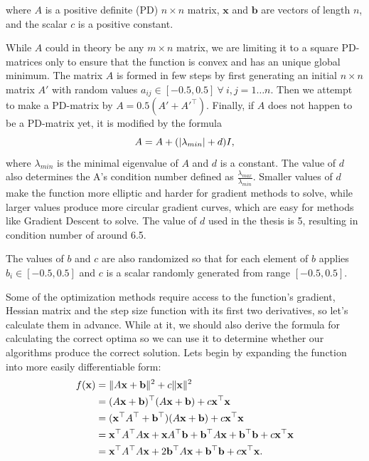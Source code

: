 \documentclass[a4paper,english,titlepage,12pt]{article}
\newcommand{\vect}[1]{\ensuremath{\mathbf{#1}}}
\newcommand{\trans}[1]{\ensuremath\vect{#1}^\top}
\newcommand{\norm}[1]{\ensuremath\Vert #1 \Vert}
\newcommand{\abs}[1]{\ensuremath|#1|}
\begin{document}
where $A$ is a positive definite (PD) $n \times n$ matrix, $\vect{x}$ and $\vect{b}$ are vectors of length $n$, and the scalar $c$ is a positive constant.

While $A$ could in theory be any $m \times n$ matrix, we are limiting it to a square PD-matrices only to ensure that the function is convex and has an unique global minimum. The matrix $A$ is formed in few steps by first generating an initial $n \times n$ matrix $A'$ with random values $a_{ij} \in [-0.5, 0.5]\ \forall\ i,j = 1 \dots n$. Then we attempt to make a PD-matrix by $A = 0.5 (A' + A'^\top)$. Finally, if  $A$ does not happen to be a PD-matrix yet, it is modified by the formula 
\begin{equation}
    A = A + (\abs{\lambda_{min}} + d) I,
\end{equation}
where $\lambda_{min}$ is the minimal eigenvalue of $A$ and $d$ is a constant. The value of $d$ also determines the A's condition number defined as $\frac{\lambda_{max}}{\lambda_{min}}$. Smaller values of $d$ make the function more elliptic and harder for gradient methods to solve, while larger values produce more circular gradient curves, which are easy for methods like Gradient Descent to solve. The value of $d$ used in the thesis is 5, resulting in condition number of around 6.5.

The values of $b$ and $c$ are also randomized so that for each element of $b$ applies $b_i \in [-0.5, 0.5]$ and $c$ is a scalar randomly generated from range $[-0.5, 0.5]$.

Some of the optimization methods require access to the function's gradient, Hessian matrix and the step size function with its first two derivatives, so let's calculate them in advance. While at it, we should also derive the formula for calculating the correct optima so we can use it to determine whether our algorithms produce the correct solution. Lets begin by expanding the function into more easily differentiable form:
\begin{align*}
    f(\vect{x}) &= \norm{A \vect{x} + \vect{b}} ^ 2 + c \norm{\vect{x}} ^ 2 \\
               &= (A \vect{x} + \vect{b})^\top(A \vect{x} + \vect{b}) + c \trans{x} \vect{x} \\
               &= (\trans{x} A^\top + \trans{b})(A\vect{x} + \vect{b}) + c \trans{x} \vect{x} \\
               &= \trans{x} A^\top A \vect{x} + \vect{x} A^\top \vect{b} + \trans{b} A \vect{x} + \trans{b} \vect{b} + c \trans{x} \vect{x} \\
               &= \trans{x} A^\top A \vect{x} + 2 \trans{b} A \vect{x} + \trans{b} \vect{b} + c \trans{x} \vect{x}.
\end{align*}
\end{document}
